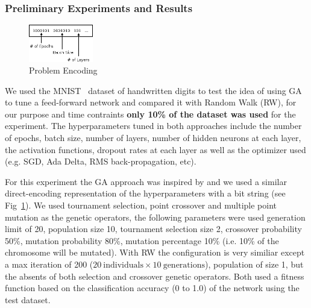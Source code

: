 \subsubsection{Preliminary Experiments and Results}

\begin{figure}
	\vspace{-0.4cm}
	\centering
	\includegraphics[width=0.25\textwidth]{sections/imgs/ga/ga_encoding.png}
	\caption{Problem Encoding}
	\label{fig:ga_encoding}
\end{figure}

We used the MNIST~\cite{lecun1998mnist} dataset of handwritten digits to test the idea of using GA to tune a feed-forward network and compared it with Random Walk (RW), for our purpose and time contraints \textbf{only 10\% of the dataset was used} for the experiment. The hyperparameters tuned in both approaches include the number of epochs, batch size, number of layers, number of hidden neurons at each layer, the activation functions, dropout rates at each layer as well as the optimizer used (e.g. SGD, Ada Delta, RMS back-propagation, etc). 

For this experiment the GA approach was inspired by \cite{whitley1990genetic} and we used a similar direct-encoding representation of the hyperparameters with a bit string (see Fig~\ref{fig:ga_encoding}). We used tournament selection, point crossover and multiple point mutation as the genetic operators, the following parameters were used generation limit of 20, population size 10, tournament selection size 2, crossover probability 50\%, mutation probability 80\%, mutation percentage 10\% (i.e. 10\% of the chromosome will be mutated). With RW the configuration is very similiar except a max iteration of 200 ($20~\text{individuals} \times 10~\text{generations}$), population of size 1, but the absents of both selection and crossover genetic operators. Both used a fitness function based on the classification accuracy (0 to 1.0) of the network using the test dataset.


